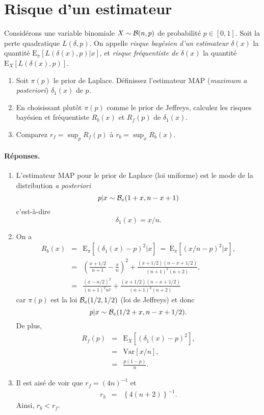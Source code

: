 \documentclass[10pt]{article}
\newcommand{\E}{\mbox{E}}
\newcommand{\V}{\mbox{Var}}
\newcommand{\1}{\mathbbm{1}}
\begin{document}
\section{Risque d'un estimateur}

Considérons une variable binomiale $X\sim{\cal{B}}(n,p)$ de probabilité $p\in[0,1]$. Soit la perte quadratique $L(\delta,p)$. On appelle {\it risque bayésien d'un estimateur $\delta(x)$} la quantité $\E_{\pi}[L(\delta(x),p)|x]$, et  {\it risque fréquentiste de $\delta(x)$}  la quantité $\E_{X}[L(\delta(x),p)]$.
\begin{enumerate}
\item Soit $\pi(p)$ le prior de Laplace. Définissez l'estimateur MAP ({\it maximum a posteriori}) $\delta_1(x)$ de $p$.
\item En choisissant plutôt $\pi(p)$ comme le prior de Jeffreys, calculez les risques bayésien et fréquentiste $R_b(x)$ et $R_f(p)$ de  $\delta_1(x)$.
\item Comparez $r_f = \sup_p R_f(p)$ à 
$r_b  =  \sup_x R_b(x)$. 
\end{enumerate}

\paragraph{\bf Réponses.}
\begin{enumerate}
\item L'estimateur MAP pour le prior de Laplace (loi uniforme) est le mode de la distribution {\it a posteriori}
$$
p|x \sim {\cal{B}}_e(1+x,n-x+1)
$$
c'est-à-dire
$$
\delta_1(x) = x/n.
$$
\item On a 
\begin{eqnarray*}
R_b(x) &= & \E_{\pi}\left[(\delta_1(x)-p)^2|x\right] \ = \ \E_{\pi}\left[(x/n-p)^2|x\right], \\
& = & \left(\frac{x+1/2}{n+1} - \frac{x}{n}\right)^2 + \frac{(x+1/2)(n-x+1/2)}{(n+1)^2(n+2)}, \\
& = & \frac{(x-n/2)^2}{(n+1)^2 n^2} + \frac{(x+1/2)(n-x+1/2)}{(n+1)^2(n+2)}
\end{eqnarray*}
car $\pi(p)$ est la loi ${\cal{B}}_e(1/2,1/2)$ (loi de Jeffreys) et donc
$$
p|x \sim {\cal{B}}_e(1/2+x,n-x+1/2). 
$$
De plus, 
\begin{eqnarray*}
R_f(p) & = & \E_X\left[\left(\delta_1(x)- p\right)^2\right], \\
& = & \V\left[x/n\right], \\
& = & \frac{p(1-p)}{n}.
\end{eqnarray*}
\item Il est aisé de voir que $r_f =(4n)^{-1}$ et 
\begin{eqnarray*}
r_b  & = & \left\{4(n+2)\right\}^{-1}.
\end{eqnarray*}
Ainsi, $r_b< r_f$. 
\end{enumerate}
\end{document}

